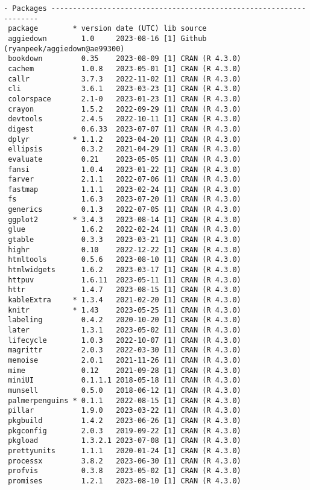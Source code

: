 \documentclass[twoside,12pt,final]{ucthesis-CA2012}
\begin{document}
\begin{ucmainmatter}
\begin{verbatim}
- Packages -------------------------------------------------------------------
 package        * version date (UTC) lib source
 aggiedown        1.0     2023-08-16 [1] Github (ryanpeek/aggiedown@ae99300)
 bookdown         0.35    2023-08-09 [1] CRAN (R 4.3.0)
 cachem           1.0.8   2023-05-01 [1] CRAN (R 4.3.0)
 callr            3.7.3   2022-11-02 [1] CRAN (R 4.3.0)
 cli              3.6.1   2023-03-23 [1] CRAN (R 4.3.0)
 colorspace       2.1-0   2023-01-23 [1] CRAN (R 4.3.0)
 crayon           1.5.2   2022-09-29 [1] CRAN (R 4.3.0)
 devtools         2.4.5   2022-10-11 [1] CRAN (R 4.3.0)
 digest           0.6.33  2023-07-07 [1] CRAN (R 4.3.0)
 dplyr          * 1.1.2   2023-04-20 [1] CRAN (R 4.3.0)
 ellipsis         0.3.2   2021-04-29 [1] CRAN (R 4.3.0)
 evaluate         0.21    2023-05-05 [1] CRAN (R 4.3.0)
 fansi            1.0.4   2023-01-22 [1] CRAN (R 4.3.0)
 farver           2.1.1   2022-07-06 [1] CRAN (R 4.3.0)
 fastmap          1.1.1   2023-02-24 [1] CRAN (R 4.3.0)
 fs               1.6.3   2023-07-20 [1] CRAN (R 4.3.0)
 generics         0.1.3   2022-07-05 [1] CRAN (R 4.3.0)
 ggplot2        * 3.4.3   2023-08-14 [1] CRAN (R 4.3.0)
 glue             1.6.2   2022-02-24 [1] CRAN (R 4.3.0)
 gtable           0.3.3   2023-03-21 [1] CRAN (R 4.3.0)
 highr            0.10    2022-12-22 [1] CRAN (R 4.3.0)
 htmltools        0.5.6   2023-08-10 [1] CRAN (R 4.3.0)
 htmlwidgets      1.6.2   2023-03-17 [1] CRAN (R 4.3.0)
 httpuv           1.6.11  2023-05-11 [1] CRAN (R 4.3.0)
 httr             1.4.7   2023-08-15 [1] CRAN (R 4.3.0)
 kableExtra     * 1.3.4   2021-02-20 [1] CRAN (R 4.3.0)
 knitr          * 1.43    2023-05-25 [1] CRAN (R 4.3.0)
 labeling         0.4.2   2020-10-20 [1] CRAN (R 4.3.0)
 later            1.3.1   2023-05-02 [1] CRAN (R 4.3.0)
 lifecycle        1.0.3   2022-10-07 [1] CRAN (R 4.3.0)
 magrittr         2.0.3   2022-03-30 [1] CRAN (R 4.3.0)
 memoise          2.0.1   2021-11-26 [1] CRAN (R 4.3.0)
 mime             0.12    2021-09-28 [1] CRAN (R 4.3.0)
 miniUI           0.1.1.1 2018-05-18 [1] CRAN (R 4.3.0)
 munsell          0.5.0   2018-06-12 [1] CRAN (R 4.3.0)
 palmerpenguins * 0.1.1   2022-08-15 [1] CRAN (R 4.3.0)
 pillar           1.9.0   2023-03-22 [1] CRAN (R 4.3.0)
 pkgbuild         1.4.2   2023-06-26 [1] CRAN (R 4.3.0)
 pkgconfig        2.0.3   2019-09-22 [1] CRAN (R 4.3.0)
 pkgload          1.3.2.1 2023-07-08 [1] CRAN (R 4.3.0)
 prettyunits      1.1.1   2020-01-24 [1] CRAN (R 4.3.0)
 processx         3.8.2   2023-06-30 [1] CRAN (R 4.3.0)
 profvis          0.3.8   2023-05-02 [1] CRAN (R 4.3.0)
 promises         1.2.1   2023-08-10 [1] CRAN (R 4.3.0)

\end{verbatim}
\end{ucmainmatter}
\end{document}
